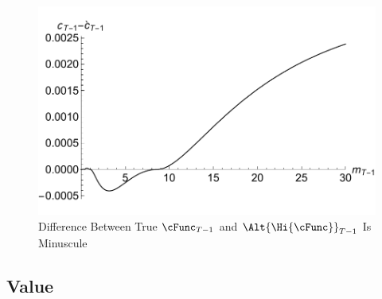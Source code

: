 \documentclass[titlepage]{\econtex}
\begin{document}
\hypertarget{IntExpFOCInvPesReaOptGapPlot}{}
\begin{figure}
        \includegraphics{./Figures/IntExpFOCInvPesReaOptGapPlot}
        \caption{Difference Between True $\cFunc_{T-1}$ and $\Alt{\Hi{\cFunc}}_{T-1}$ Is Minuscule}
        \label{fig:IntExpFOCInvPesReaOptGapPlot}
\end{figure}




\hypertarget{Value}{}
\subsection{Value}
\end{document}
